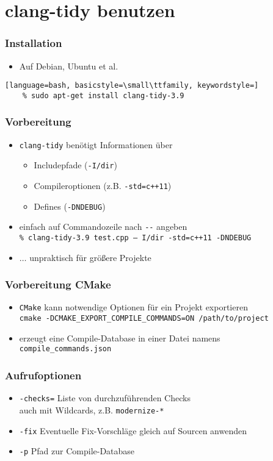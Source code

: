 \documentclass[aspectratio=169]{beamer}
\begin{document}
\section{clang-tidy benutzen}
\begin{frame}[fragile]
  \frametitle{Installation}
  \begin{itemize}
    \item Auf Debian, Ubuntu et al.
  \end{itemize}
  \begin{lstlisting}[language=bash, basicstyle=\small\ttfamily, keywordstyle=]
    % sudo apt-get install clang-tidy-3.9
  \end{lstlisting}
\end{frame}
\begin{frame}
  \frametitle{Vorbereitung}
  \begin{itemize}
  \item \texttt{clang-tidy} benötigt Informationen über \pause
    \begin{itemize}
    \item Includepfade (\texttt{-I/dir})
      \pause
    \item Compileroptionen (z.B. \texttt{-std=c++11})
      \pause
    \item Defines (\texttt{-DNDEBUG})
    \end{itemize}
    \pause
  \item einfach auf Commandozeile nach \texttt{-{}-} angeben\\
    \qquad \texttt{\% clang-tidy-3.9 test.cpp -- I/dir -std=c++11 -DNDEBUG}
  \item $\ldots{}$ unpraktisch für größere Projekte
  \end{itemize}
\end{frame}
\begin{frame}
  \frametitle{Vorbereitung CMake}
  \begin{itemize}
  \item \texttt{CMake} kann notwendige Optionen für ein Projekt exportieren\\
    \pause \texttt{cmake -DCMAKE\_EXPORT\_COMPILE\_COMMANDS=ON /path/to/project}
    \pause
  \item erzeugt eine Compile-Database in einer Datei namens \texttt{compile\_commands.json}
  \end{itemize}
\end{frame}
\begin{frame}
  \frametitle{Aufrufoptionen}
  \begin{itemize}
  \item \texttt{-checks=} Liste von durchzuführenden Checks\\
    \qquad auch mit Wildcards, z.B. \texttt{modernize-*}
  \item \texttt{-fix} Eventuelle Fix-Vorschläge gleich auf Sourcen anwenden
  \item \texttt{-p} Pfad zur Compile-Database
  \end{itemize}
\end{frame}
\end{document}
